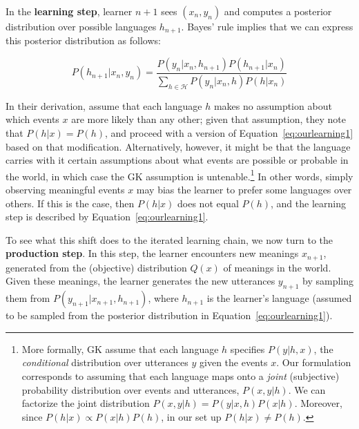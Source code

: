 \documentclass{apa}
\begin{document}
In the {\bf learning step}, learner $n+1$ sees $(x_n,y_n)$ and computes a posterior distribution over possible languages $h_{n+1}$. Bayes' rule implies that we can express this posterior distribution as follows:

\begin{equation}
P(h_{n+1}|x_n,y_n) = \frac{P(y_n|x_n,h_{n+1}) P(h_{n+1}|x_n)}{\sum_{h \in \mathcal{H}} P(y_n|x_n,h) P(h|x_n)}
\label{eq:ourlearning1}
\end{equation}

\noindent
In their derivation,  assume that each language $h$ makes no assumption about which events $x$ are more likely than any other; given that assumption, they note that
$P(h|x) = P(h)$, and proceed with a version of Equation~\ref{eq:ourlearning1} based on that modification. Alternatively, however, it might be that the language carries with it certain assumptions about what events are possible or probable in the world, in which case the GK assumption is untenable.\footnote{More formally, GK assume that each language $h$ specifies $P(y | h,x)$, the {\it conditional} distribution over utterances $y$ given the events $x$. Our formulation corresponds to assuming that each language maps onto a {\it joint} (subjective) probability distribution over events and utterances, $P(x,y | h)$. We can factorize the joint distribution $P(x,y | h) = P(y | x,h) P(x | h)$. Moreover, since $P(h | x) \propto P(x | h) P(h)$, in our set up $P(h|x) \neq P(h)$.} In other words, simply observing meaningful events $x$ may bias the learner to prefer some languages over others.  If this is the case, then $P(h|x)$ does not equal $P(h)$, and the learning step is described by Equation~\ref{eq:ourlearning1}.

To see what this shift does to the iterated learning chain, we now turn to the {\bf production step}. In this step, the learner encounters new meanings $x_{n+1}$, generated from the (objective) distribution $Q(x)$ of meanings in the world. Given these meanings, the learner generates the new utterances $y_{n+1}$ by sampling them from $P(y_{n+1}|x_{n+1},h_{n+1})$, where $h_{n+1}$ is the learner's language (assumed to be sampled from the posterior distribution in Equation~\ref{eq:ourlearning1}).
\end{document}
